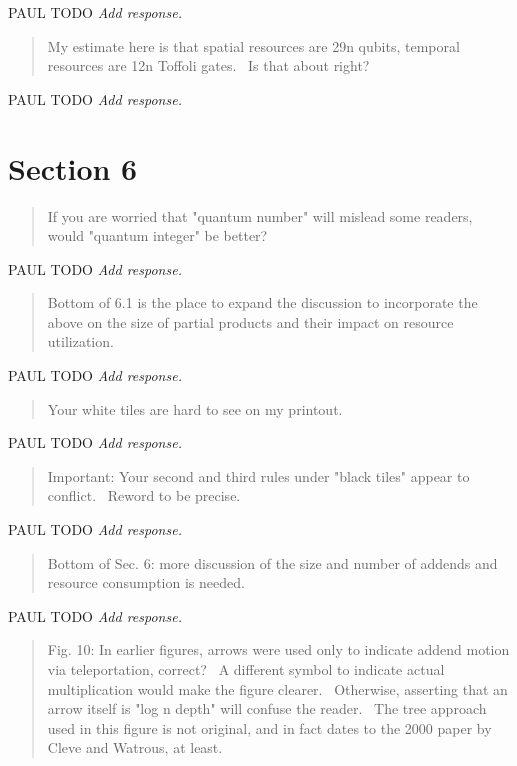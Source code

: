 \documentclass{article}
\theoremstyle{plain} \newtheorem{lemma}{Lemma}
\begin{document}
PAUL TODO
{\it Add response.}

\begin{quote}
My estimate here is that spatial resources are 29n qubits, temporal
resources are 12n Toffoli gates.  Is that about right?
\end{quote}

PAUL TODO
{\it Add response.}

\section{Section 6}

\begin{quote}
If you are worried that "quantum number" will mislead some readers,
would "quantum integer" be better?
\end{quote}

PAUL TODO
{\it Add response.}

\begin{quote}
Bottom of 6.1 is the place to expand the discussion to incorporate the
above on the size of partial products and their impact on resource
utilization.
\end{quote}

PAUL TODO
{\it Add response.}

\begin{quote}
Your white tiles are hard to see on my printout.
\end{quote}

PAUL TODO
{\it Add response.}

\begin{quote}
Important: Your second and third rules under "black tiles" appear to
conflict.  Reword to be precise.
\end{quote}

PAUL TODO
{\it Add response.}

\begin{quote}
Bottom of Sec. 6: more discussion of the size and number of addends
and resource consumption is needed.
\end{quote}

PAUL TODO
{\it Add response.}

\begin{quote}
Fig. 10: In earlier figures, arrows were used only to indicate addend
motion via teleportation, correct?  A different symbol to indicate
actual multiplication would make the figure clearer.  Otherwise,
asserting that an arrow itself is "log n depth" will confuse the
reader.  The tree approach used in this figure is not original, and in
fact dates to the 2000 paper by Cleve and Watrous, at least.
\end{quote}
\end{document}
